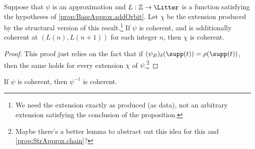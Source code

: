 \begin{proposition}
  \label{prop:StrApprox.addOrbit}
  \leanok
  Suppose that \( \psi \) is an approximation and \( L : \mathbb Z \to \Litter \) is a function satisfying the hypotheses of \cref{prop:BaseApprox.addOrbit}.
  Let \( \chi \) be the extension produced by the structural version of this result.\footnote{We need the extension exactly as produced (as data), not an arbitrary extension satisfying the conclusion of the proposition.}
  If \( \psi \) is coherent, and is additionally coherent at \( (L(n), L(n+1)) \) for each integer \( n \), then \( \chi \) is coherent.
\end{proposition}
\begin{proof}
  \leanok
  This proof just relies on the fact that if \( (\psi_B)_\delta(\supp(t)) = \rho(\supp(t)) \), then the same holds for every extension \( \chi \) of \( \psi \).\footnote{Maybe there's a better lemma to abstract out this idea for this and \cref{prop:StrApprox.chain}?}
\end{proof}
\begin{proposition}
  \label{prop:StrApprox.Coherent.inv}
  If \( \psi \) is coherent, then \( \psi^{-1} \) is coherent.
\end{proposition}
